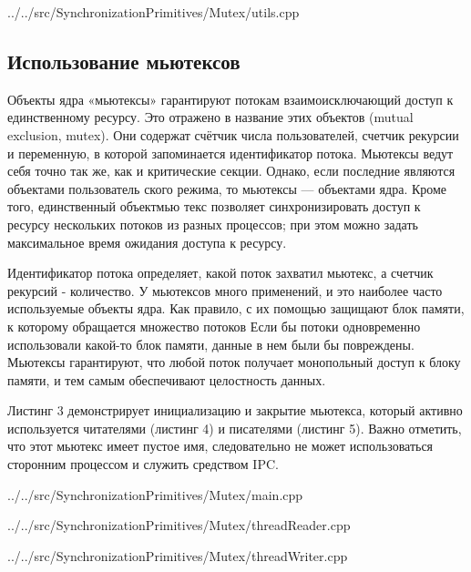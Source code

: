 \documentclass[a4paper, 12pt]{article}		%
\begin{document}

{../../src/SynchronizationPrimitives/Mutex/utils.cpp}

\newpage
\subsection{Использование мьютексов}

Объекты ядра «мьютексы» гарантируют потокам взаимоисключающий доступ к единственному ресурсу. Это отражено в название этих объектов (mutual exclusion, mutex). Они содержат счётчик числа пользователей, счетчик рекурсии и переменную, в которой запоминается идентификатор потока. Мьютексы ведут себя точно так же, как и критические секции. Однако, если последние являются объектами пользователь ского режима, то мьютексы — объектами ядра. Кроме того, единственный объектмью текс позволяет синхронизировать доступ к ресурсу нескольких потоков из разных процессов; при этом можно задать максимальное время ожидания доступа к ресурсу.

Идентификатор потока определяет, какой поток захватил мьютекс, а счетчик рекурсий - количество. У мьютексов много применений, и это наиболее часто используемые объекты ядра. Как правило, с их помощью защищают блок памяти, к которому обращается множество потоков Если бы потоки одновременно использовали какой-то блок памяти, данные в нем были бы повреждены. Мьютексы гарантируют, что любой поток получает монопольный доступ к блоку памяти, и тем самым обеспечивают целостность данных.

Листинг 3 демонстрирует инициализацию и закрытие мьютекса, который активно используется читателями (листинг 4) и писателями (листинг 5). Важно отметить, что этот мьютекс имеет пустое имя, следовательно не может использоваться сторонним процессом и служить средством IPC.


{../../src/SynchronizationPrimitives/Mutex/main.cpp}


{../../src/SynchronizationPrimitives/Mutex/threadReader.cpp}


{../../src/SynchronizationPrimitives/Mutex/threadWriter.cpp}
\end{document}
